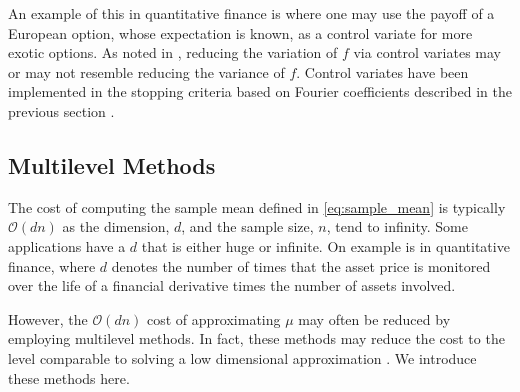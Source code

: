\documentclass{svproc}
\begin{document}
An example of this in quantitative finance is where one may use the payoff of a European option, whose expectation is known, as a control variate for more exotic options.  As noted in \cite{HicEtal03}, reducing the variation of $f$ via control variates may or may not resemble reducing the variance of $f$.  Control variates have been implemented in the stopping criteria based on Fourier coefficients described in the previous section \cite{HicEtal17a}.



\subsection{Multilevel Methods} \label{sec:multi}
The cost of computing the sample mean defined in \eqref{eq:sample_mean} is typically $\mathcal{O}(dn)$ as the dimension, $d$, and the sample size, $n$, tend to infinity.  Some applications have a $d$ that is either huge or infinite.  On example is in quantitative finance, where $d$ denotes the number of times that the asset price is monitored over the life of a financial derivative times the number of assets involved.  

However, the $\mathcal{O}(dn)$ cost of approximating $\mu$ may often be reduced by employing multilevel methods.  In fact, these methods may reduce the cost to the level comparable to solving a low dimensional approximation \cite{Gil15a}. We introduce these methods here.
\end{document}
